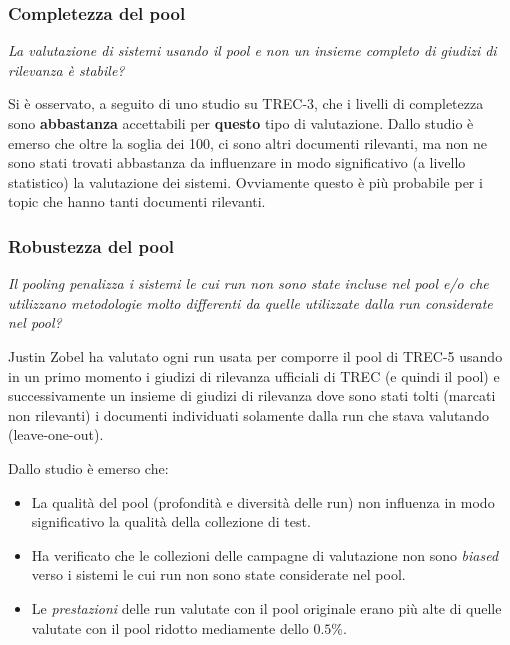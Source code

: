 \subsubsection{Completezza del pool}
\begin{center}
\textit{La valutazione di sistemi usando il pool e non un insieme completo di giudizi di rilevanza è stabile?}
\end{center}

Si è osservato, a seguito di uno studio su TREC-3, che i livelli di completezza sono \textbf{abbastanza} accettabili per \textbf{questo} tipo di valutazione.
Dallo studio è emerso che oltre la soglia dei 100, ci sono altri documenti rilevanti, ma non ne sono stati trovati abbastanza da influenzare in modo significativo (a livello statistico) la valutazione dei sistemi. Ovviamente questo è più probabile per i topic che hanno tanti documenti rilevanti.

\subsubsection{Robustezza del pool}

\begin{center}
\textit{Il pooling penalizza i sistemi le cui run non sono state incluse nel pool e/o che utilizzano metodologie molto differenti da quelle utilizzate dalla run considerate nel pool?}
\end{center}

Justin Zobel ha valutato ogni run usata per comporre il pool di TREC-5 usando in un primo momento i giudizi di rilevanza ufficiali di TREC (e quindi il pool) e successivamente un insieme di giudizi di rilevanza dove sono stati tolti (marcati non rilevanti) i documenti individuati solamente dalla run che stava valutando (leave-one-out).

Dallo studio è emerso che:

\begin{itemize}
	\item La qualità del pool (profondità e diversità delle run) non influenza in modo significativo la qualità della collezione di test.
	\item Ha verificato che le collezioni delle campagne di valutazione non sono \textit{biased} verso i sistemi le cui run non sono state considerate nel pool.
	\item Le \textit{prestazioni} delle run valutate con il pool originale erano più alte di quelle valutate con il pool ridotto mediamente dello $0.5\%$.
\end{itemize}

